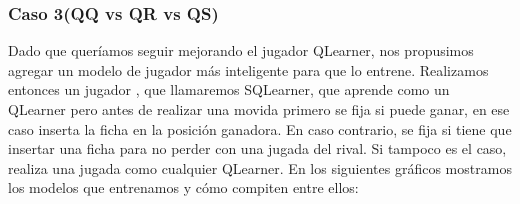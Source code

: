 \documentclass[10pt, a4paper]{article}
\begin{document}
\subsubsection{Caso 3(QQ vs QR vs QS)}

Dado que queríamos seguir mejorando el jugador QLearner, nos propusimos agregar un modelo de jugador más inteligente para que lo entrene.  Realizamos entonces un jugador , que llamaremos SQLearner, que aprende como un QLearner pero antes de realizar una movida primero se fija si puede ganar, en ese caso inserta la ficha en la posición ganadora. En caso contrario, se fija si tiene que insertar una ficha para no perder con una jugada del rival. Si tampoco es el caso, realiza una jugada como cualquier QLearner.
En los siguientes gráficos mostramos los modelos que entrenamos y cómo compiten entre ellos:
\end{document}
